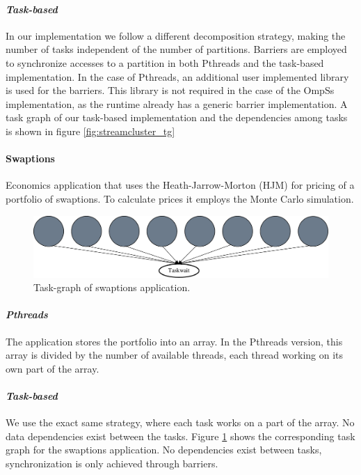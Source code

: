 {\paragraph{\textit{Task-based}}
In our implementation we follow a different decomposition strategy, making the number of tasks independent
of the number of partitions.   
Barriers are employed to synchronize accesses
to a partition in both Pthreads and the task-based implementation. 
In the case of Pthreads, an additional user 
implemented library is used for the barriers. 
This library is not required in the case of the OmpSs implementation, as 
the runtime already has a generic barrier implementation.
A task graph of our task-based implementation and the dependencies among tasks is shown in figure \ref{fig:streamcluster_tg}

\paragraph{\textbf{Swaptions}}
Economics application that uses the Heath-Jarrow-Morton (HJM)\cite{RePEc:ecm:emetrp:v:60:y:1992:i:1:p:77-105} for pricing of a portfolio of swaptions. To calculate prices it employs the Monte Carlo simulation.

\begin{figure}[ht!]%
	\center
	\includegraphics[width=.8\columnwidth]{ifcg/figures/swaptions_taskgraph}%
	\caption{Task-graph of swaptions application.}
	\label{fig:swaptions_tg}%
	\vspace{.5cm}
\end{figure}


\paragraph{\textit{Pthreads}}
The application stores the portfolio into an array. In the Pthreads version, this array is divided by the number of available threads, each thread working on its own part of the array. 

\paragraph{\textit{Task-based}}
We use the exact same strategy, where each task works on a part of the array.  No data dependencies exist between the tasks.
Figure \ref{fig:swaptions_tg} shows the corresponding task graph for the swaptions application.  No dependencies exist between tasks,
synchronization is only achieved through barriers.


}
